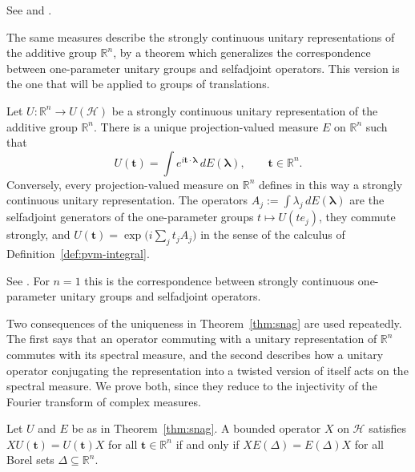 \noindent See \cite[TODO-location]{TODO-RS03} and \cite[TODO-location]{TODO-Mor18}.

The same measures describe the strongly continuous unitary representations of the additive group $\mathbb{R}^n$, by a theorem which generalizes the correspondence between one-parameter unitary groups and selfadjoint operators. This version is the one that will be applied to groups of translations.

\begin{theorem}\label{thm:snag}
	Let $U:\mathbb{R}^n\to U(\mathcal{H})$ be a strongly continuous unitary representation of the additive group $\mathbb{R}^n$. There is a unique projection-valued measure $E$ on $\mathbb{R}^n$ such that
	\begin{equation*}
		U(\mathbf{t})=\int e^{i\mathbf{t}\cdot\boldsymbol{\lambda}}\,dE(\boldsymbol{\lambda}), \qquad \mathbf{t}\in\mathbb{R}^n.
	\end{equation*}
	Conversely, every projection-valued measure on $\mathbb{R}^n$ defines in this way a strongly continuous unitary representation. The operators $A_j:=\int\lambda_j\,dE(\boldsymbol{\lambda})$ are the selfadjoint generators of the one-parameter groups $t\mapsto U(te_j)$, they commute strongly, and $U(\mathbf{t})=\exp\big(i\sum_jt_jA_j\big)$ in the sense of the calculus of Definition~\ref{def:pvm-integral}.
\end{theorem}

\noindent See \cite[TODO-location]{TODO-SNAG}. For $n=1$ this is the correspondence between strongly continuous one-parameter unitary groups and selfadjoint operators.

Two consequences of the uniqueness in Theorem~\ref{thm:snag} are used repeatedly. The first says that an operator commuting with a unitary representation of $\mathbb{R}^n$ commutes with its spectral measure, and the second describes how a unitary operator conjugating the representation into a twisted version of itself acts on the spectral measure. We prove both, since they reduce to the injectivity of the Fourier transform of complex measures.

\begin{proposition}\label{prop:pvm-commutation}
	Let $U$ and $E$ be as in Theorem~\ref{thm:snag}. A bounded operator $X$ on $\mathcal{H}$ satisfies $XU(\mathbf{t})=U(\mathbf{t})X$ for all $\mathbf{t}\in\mathbb{R}^n$ if and only if $XE(\Delta)=E(\Delta)X$ for all Borel sets $\Delta\subseteq\mathbb{R}^n$.
\end{proposition}


